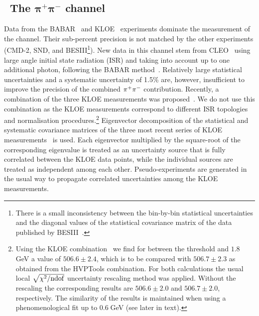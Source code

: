 \subsection{~The \sansmath$\mathbf{\boldsymbol{\pi^+\pi^-}}$ channel}
\label{sec:pipi}

Data from the BABAR~\cite{babarpipi1,babarpipi2} and KLOE~\cite{kloe08,kloe10,kloe12} experiments dominate  the measurement of the \pp channel. Their  sub-percent precision is not matched by the other experiments (CMD-2, SND, and BESIII\footnote{There is a small inconsistency between the bin-by-bin statistical uncertainties and the diagonal values of the statistical covariance matrix of the \pp data published by BESIII~\cite{bes2015}.}). New data in this channel stem from CLEO~\cite{cleo2017} using large angle initial state radiation (ISR) and taking into account up to one additional photon, following the BABAR method~\cite{babarpipi1}. Relatively large statistical uncertainties and a systematic uncertainty of 1.5\% are, however, insufficient to improve the precision of the combined $\pi^+\pi^-$ contribution. Recently, a combination of the three KLOE measurements was proposed~\cite{kloe17}. We do not use this combination as the KLOE measurements correspond to different ISR topologies and normalisation procedures.\footnote{Using the  KLOE combination~\cite{kloe17} we find for \amuhadLOpp  between the \pp threshold and $1.8\;$GeV a value of $506.6 \pm 2.4$, which is to be compared with $506.7 \pm 2.3$ as obtained from the HVPTools combination. For both calculations the usual local $\sqrt{\chi^2/{\rm ndof}}$ uncertainty rescaling method was applied. Without the rescaling the corresponding results are $506.6 \pm 2.0$ and $506.7 \pm 2.0$, respectively. The similarity of the results is maintained when using a phenomenological fit up to 0.6$\;$GeV (see later in text).} Eigenvector decomposition of the statistical and systematic covariance matrices of the three most recent series of KLOE measurements~\cite{kloe17} is used. Each eigenvector multiplied by the square-root of the corresponding eigenvalue is treated as an uncertainty source that is fully correlated between the  KLOE data points, while the individual sources are treated as independent among each other. Pseudo-experiments are generated in the usual way to propagate correlated uncertainties among the KLOE measurements.

